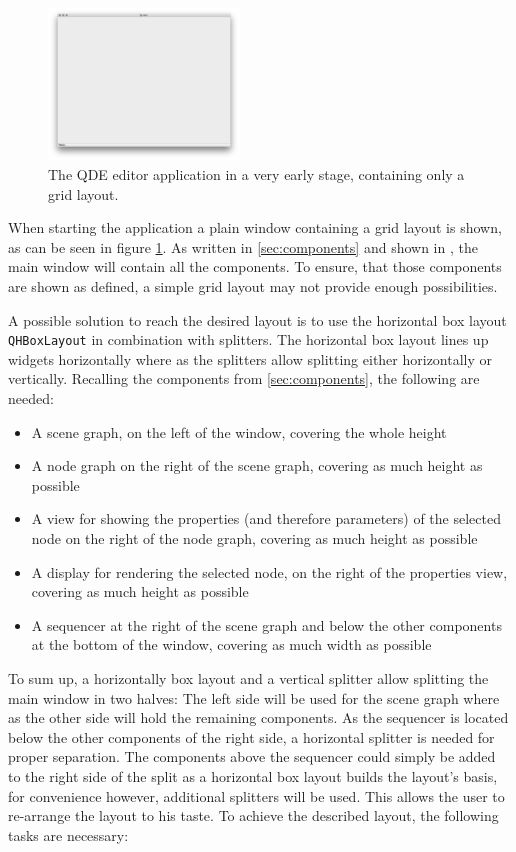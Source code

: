 \documentclass[10pt, openright, notitlepage]{scrreprt}
\begin{document}
\begin{figure}[H]
\centering
\includegraphics[width=2in]{./images/qde_alpha.png}
\caption{\label{fig:editor-alpha}
The QDE editor application in a very early stage, containing only a grid layout.}
\end{figure}

When starting the application a plain window containing a grid layout is shown,
as can be seen in figure \ref{fig:editor-alpha}. As written in \ref{sec:components} and
shown in \citep[p. 29 ff.]{osterwalder_qde_2016}, the main window will contain all
the components. To ensure, that those components are shown as defined, a simple
grid layout may not provide enough possibilities.

A possible solution to reach the desired layout is to use the horizontal box
layout \texttt{QHBoxLayout} in combination with splitters. The horizontal box layout
lines up widgets horizontally where as the splitters allow splitting either
horizontally or vertically. Recalling the components from \ref{sec:components}, the following are needed:

\begin{itemize}
\item A scene graph, on the left of the window, covering the whole height
\item A node graph on the right of the scene graph, covering as much height as
possible
\item A view for showing the properties (and therefore parameters) of the selected
node on the right of the node graph, covering as much height as possible
\item A display for rendering the selected node, on the right of the properties
view, covering as much height as possible
\item A sequencer at the right of the scene graph and below the other components at
the bottom of the window, covering as much width as possible
\end{itemize}

To sum up, a horizontally box layout and a vertical splitter allow splitting the
main window in two halves: The left side will be used for the scene graph where
as the other side will hold the remaining components. As the sequencer is
located below the other components of the right side, a horizontal splitter is
needed for proper separation. The components above the sequencer could simply be
added to the right side of the split as a horizontal box layout builds the
layout's basis, for convenience however, additional splitters will be used. This
allows the user to re-arrange the layout to his taste. To achieve the described
layout, the following tasks are necessary:
\end{document}
